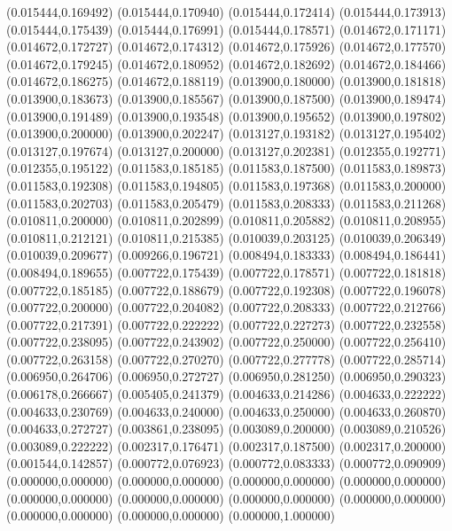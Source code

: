 (0.015444,0.169492)
(0.015444,0.170940)
(0.015444,0.172414)
(0.015444,0.173913)
(0.015444,0.175439)
(0.015444,0.176991)
(0.015444,0.178571)
(0.014672,0.171171)
(0.014672,0.172727)
(0.014672,0.174312)
(0.014672,0.175926)
(0.014672,0.177570)
(0.014672,0.179245)
(0.014672,0.180952)
(0.014672,0.182692)
(0.014672,0.184466)
(0.014672,0.186275)
(0.014672,0.188119)
(0.013900,0.180000)
(0.013900,0.181818)
(0.013900,0.183673)
(0.013900,0.185567)
(0.013900,0.187500)
(0.013900,0.189474)
(0.013900,0.191489)
(0.013900,0.193548)
(0.013900,0.195652)
(0.013900,0.197802)
(0.013900,0.200000)
(0.013900,0.202247)
(0.013127,0.193182)
(0.013127,0.195402)
(0.013127,0.197674)
(0.013127,0.200000)
(0.013127,0.202381)
(0.012355,0.192771)
(0.012355,0.195122)
(0.011583,0.185185)
(0.011583,0.187500)
(0.011583,0.189873)
(0.011583,0.192308)
(0.011583,0.194805)
(0.011583,0.197368)
(0.011583,0.200000)
(0.011583,0.202703)
(0.011583,0.205479)
(0.011583,0.208333)
(0.011583,0.211268)
(0.010811,0.200000)
(0.010811,0.202899)
(0.010811,0.205882)
(0.010811,0.208955)
(0.010811,0.212121)
(0.010811,0.215385)
(0.010039,0.203125)
(0.010039,0.206349)
(0.010039,0.209677)
(0.009266,0.196721)
(0.008494,0.183333)
(0.008494,0.186441)
(0.008494,0.189655)
(0.007722,0.175439)
(0.007722,0.178571)
(0.007722,0.181818)
(0.007722,0.185185)
(0.007722,0.188679)
(0.007722,0.192308)
(0.007722,0.196078)
(0.007722,0.200000)
(0.007722,0.204082)
(0.007722,0.208333)
(0.007722,0.212766)
(0.007722,0.217391)
(0.007722,0.222222)
(0.007722,0.227273)
(0.007722,0.232558)
(0.007722,0.238095)
(0.007722,0.243902)
(0.007722,0.250000)
(0.007722,0.256410)
(0.007722,0.263158)
(0.007722,0.270270)
(0.007722,0.277778)
(0.007722,0.285714)
(0.006950,0.264706)
(0.006950,0.272727)
(0.006950,0.281250)
(0.006950,0.290323)
(0.006178,0.266667)
(0.005405,0.241379)
(0.004633,0.214286)
(0.004633,0.222222)
(0.004633,0.230769)
(0.004633,0.240000)
(0.004633,0.250000)
(0.004633,0.260870)
(0.004633,0.272727)
(0.003861,0.238095)
(0.003089,0.200000)
(0.003089,0.210526)
(0.003089,0.222222)
(0.002317,0.176471)
(0.002317,0.187500)
(0.002317,0.200000)
(0.001544,0.142857)
(0.000772,0.076923)
(0.000772,0.083333)
(0.000772,0.090909)
(0.000000,0.000000)
(0.000000,0.000000)
(0.000000,0.000000)
(0.000000,0.000000)
(0.000000,0.000000)
(0.000000,0.000000)
(0.000000,0.000000)
(0.000000,0.000000)
(0.000000,0.000000)
(0.000000,0.000000)
(0.000000,1.000000)